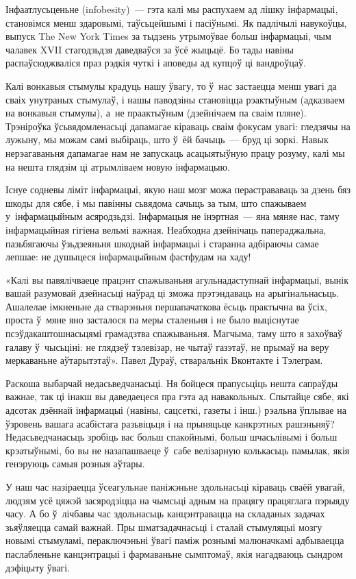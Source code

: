 Інфаатлусьценьне (infobesity)~--- гэта калі мы распухаем ад лішку інфармацыі, становімся менш здаровымі, таўсьцейшымі і пасіўнымі. Як падлічылі навукоўцы, выпуск The New York Times за тыдзень утрымоўвае больш інфармацыі, чым чалавек XVII стагодзьдзя даведваўся за ўсё жыцьцё. Бо тады навіны распаўсюджваліся праз рэдкія чуткі і аповеды ад купцоў ці вандроўцаў.

Калі вонкавыя стымулы крадуць нашу ўвагу, то ў~нас застаецца менш увагі да сваіх унутраных стымулаў, і нашы паводзіны становіцца рэактыўным (адказваем на вонкавыя стымулы), а~не праактыўным (дзейнічаем па сваім пляне). Трэніроўка ўсьвядомленасьці дапамагае кіраваць сваім фокусам увагі: гледзячы на лужыну, мы можам самі выбіраць, што ў~ёй бачыць~--- бруд ці зоркі. Навык нерэагаваньня дапамагае нам не запускаць асацыятыўную працу розуму, калі мы на нешта глядзім ці атрымліваем новую інфармацыю.

Існуе содневы ліміт інфармацыі, якую наш мозг можа перастрававаць за дзень бяз шкоды для сябе, і мы павінны сьвядома сачыць за тым, што спажываем у~інфармацыйным асяродзьдзі. Інфармацыя не інэртная~--- яна мяняе нас, таму інфармацыйная гігіена вельмі важная. Неабходна дзейнічаць папераджальна, пазьбягаючы ўзьдзеяньня шкоднай інфармацыі і старанна адбіраючы самае лепшае: не душыцеся інфармацыйным фастфудам на хаду!

«Калі вы павялічваеце працэнт спажываньня агульнадаступнай інфармацыі, вынік вашай разумовай дзейнасьці наўрад ці зможа прэтэндаваць на арыгінальнасьць. Ашалелае імкненьне да стварэньня першапачаткова ёсьць практычна ва ўсіх, проста ў~мяне яно засталося па меры сталеньня і не было выціснутае псэўдакаштошнасьцямі грамадзтва спажываньня. Магчыма, таму што я захоўваў галаву ў~чысьціні: не глядзеў тэлевізар, не чытаў газэтаў, не прымаў на веру меркаваньне аўтарытэтаў». Павел Дураў, стваральнік Вконтакте і Тэлеграм. 

Раскоша выбарчай недасьведчанасьці. Ня бойцеся прапусьціць нешта сапраўды важнае, так ці інакш вы даведаецеся пра гэта ад навакольных. Спытайце сябе, які адсотак дзённай інфармацыі (навіны, сацсеткі, газеты і інш.) рэальна ўплывае на ўзровень вашага асабістага разьвіцьця і на прыняцьце канкрэтных рашэньняў? Недасьведчанасьць зробіць вас больш спакойнымі, больш шчасьлівымі і больш крэатыўнымі, бо вы не назапашваеце ў~сабе велізарную колькасьць памылак, якія генэруюць самыя розныя аўтары.

У наш час назіраецца ўсеагульнае паніжэньне здольнасьці кіраваць сваёй увагай, людзям усё цяжэй засяродзіцца на чымсьці адным на працягу працяглага пэрыяду часу. А бо ў~лічбавы час здольнасьць канцэнтравацца на складаных задачах зьяўляецца самай важнай. Пры шматзадачнасьці і сталай стымуляцыі мозгу новымі стымуламі, пераключэньні ўвагі паміж рознымі малюначкамі адбываецца паслабленьне канцэнтрацыі і фармаваньне сымптомаў, якія нагадваюць сындром дэфіцыту ўвагі.


